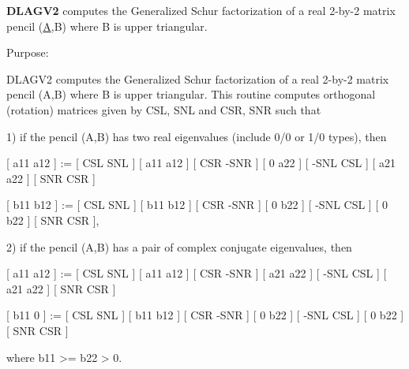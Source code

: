 {\bfseries D\+L\+A\+G\+V2} computes the Generalized Schur factorization of a real 2-\/by-\/2 matrix pencil (\hyperlink{classA}{A},B) where B is upper triangular. 

 \begin{DoxyParagraph}{Purpose\+: }
\begin{DoxyVerb} DLAGV2 computes the Generalized Schur factorization of a real 2-by-2
 matrix pencil (A,B) where B is upper triangular. This routine
 computes orthogonal (rotation) matrices given by CSL, SNL and CSR,
 SNR such that

 1) if the pencil (A,B) has two real eigenvalues (include 0/0 or 1/0
    types), then

    [ a11 a12 ] := [  CSL  SNL ] [ a11 a12 ] [  CSR -SNR ]
    [  0  a22 ]    [ -SNL  CSL ] [ a21 a22 ] [  SNR  CSR ]

    [ b11 b12 ] := [  CSL  SNL ] [ b11 b12 ] [  CSR -SNR ]
    [  0  b22 ]    [ -SNL  CSL ] [  0  b22 ] [  SNR  CSR ],

 2) if the pencil (A,B) has a pair of complex conjugate eigenvalues,
    then

    [ a11 a12 ] := [  CSL  SNL ] [ a11 a12 ] [  CSR -SNR ]
    [ a21 a22 ]    [ -SNL  CSL ] [ a21 a22 ] [  SNR  CSR ]

    [ b11  0  ] := [  CSL  SNL ] [ b11 b12 ] [  CSR -SNR ]
    [  0  b22 ]    [ -SNL  CSL ] [  0  b22 ] [  SNR  CSR ]

    where b11 >= b22 > 0.\end{DoxyVerb}
 
\end{DoxyParagraph}

